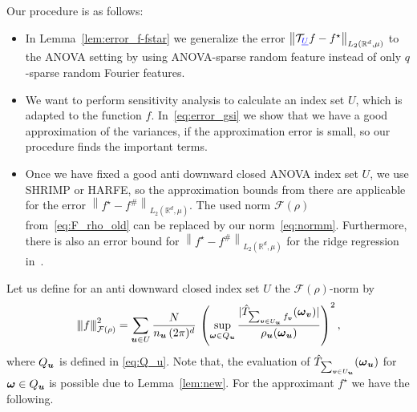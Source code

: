 \documentclass{article}
\renewcommand{\vec}[1]{\ensuremath \mathbf{\boldsymbol{#1}}}
\newcommand{\w}{\ensuremath{\vec \omega}}
\newcommand{\normm}[1]{{\left\vert\kern-0.25ex\left\vert\kern-0.25ex\left\vert #1 
    \right\vert\kern-0.25ex\right\vert\kern-0.25ex\right\vert}}
\newcommand{\F}{\ensuremath{\mathcal{F}}}
\newcommand{\R}{\ensuremath{\mathbb{R}}}
\newcommand{\norm}[1]{\left\lVert {#1} \right\rVert}    %
\newcommand{\TT}{\mathcal T}				%
\theoremstyle{definition}
\numberwithin{equation}{section}
\begin{document}
Our procedure is as follows:
\begin{itemize}
	\item In Lemma~\ref{lem:error_f-fstar} we generalize the error $\norm{\TT_{\color{blue}\underline U} f - f^\star}_{L_2(\R^d,\mu)}$ to the ANOVA setting by using ANOVA-sparse random feature instead of only $q$-sparse random Fourier features.
		\item We want to perform sensitivity analysis to calculate an index set $U$, which is adapted to the function $f$. In~\eqref{eq:error_gsi} we show that we have a good approximation of the variances, if the approximation error is small, so our procedure finds the important terms.
	\item Once we have fixed a good anti downward closed ANOVA index set $U$, we use SHRIMP or HARFE, so  the approximation bounds from there are applicable for the error $\norm{f^\star -f^\#}_{L_2(\R^d,\mu)}$. The used norm $\F(\rho)$ from~\eqref{eq:F_rho_old} can be replaced by our norm~\eqref{eq:normm}. Furthermore, there is also an error bound for $\norm{f^\star-f^\#}_{L_2(\R^d,\mu)}$ for the ridge regression in~\cite[Theorem 5.19.]{We24}.
\end{itemize}


Let us define for an anti downward closed index set $U$ the $\F(\rho)$-norm by
\begin{equation}\label{eq:normm}
\normm{f}_{\F(\rho)}^2 = \sum_{\vec u\in U}\frac{N}{n_{\vec u}\, (2\pi)^d} \, \left(\sup_{\w \in Q_{\vec u}}\frac{|\hat T_{\sum_{\vec v\in U_{\vec u}}f_{\vec v}}(\w_{\vec v})|}{\rho_{\vec u}(\w_{\vec u})}\right)^2,
\end{equation}
where $Q_{\vec u}$ is defined in \eqref{eq:Q_u}. Note that, the evaluation of $\hat T_{\sum_{\vec v\in U_{\vec u}}}(\w_{\vec u})$ for $\w \in Q_{\vec u}$ is possible due to Lemma~\ref{lem:new}.
For the approximant $f^\star$ we have the following.
\end{document}
